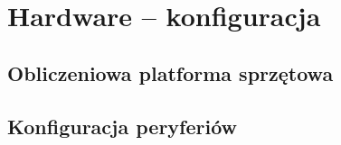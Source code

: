 \chapter{Hardware -- konfiguracja}

\section{Obliczeniowa platforma sprzętowa}

\section{Konfiguracja peryferiów}

